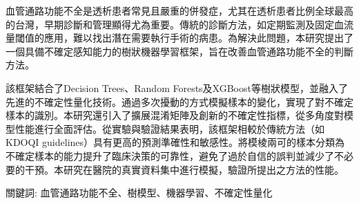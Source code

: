 \begin{abstractzh}

血管通路功能不全是透析患者常見且嚴重的併發症，尤其在透析患者比例全球最高的台灣，早期診斷和管理顯得尤為重要。傳統的診斷方法，如定期監測及固定血流量閾值的應用，難以找出潛在需要執行手術的病患。為解決此問題，本研究提出了一個具備不確定感知能力的樹狀機器學習框架，旨在改善血管通路功能不全的判斷方法。

該框架結合了Decision Trees、Random Forests及XGBoost等樹狀模型，並融入了先進的不確定性量化技術。通過多次擾動的方式模擬樣本的變化，實現了對不確定樣本的識別。本研究還引入了擴展混淆矩陣及創新的不確定性指標，從多角度對模型性能進行全面評估。從實驗與驗證結果表明，該框架相較於傳統方法（如KDOQI guidelines）具有更高的預測準確性和敏感性。將模棱兩可的樣本分類為不確定樣本的能力提升了臨床決策的可靠性，避免了過於自信的誤判並減少了不必要的干預。本研究在醫院的真實資料集中進行模擬，驗證所提出之方法的性能。

\vspace{5cm}

關鍵詞: 血管通路功能不全、樹模型、機器學習、不確定性量化

\end{abstractzh}